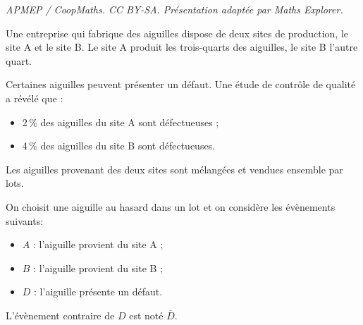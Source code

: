 \documentclass[10pt]{article}
\begin{document}
\noindent\textit{APMEP / CoopMaths. CC BY-SA. Présentation adaptée par Maths Explorer.}\par\medskip
\medskip

Une entreprise qui fabrique des aiguilles dispose de deux sites de production, le site A et le site B.
Le site A produit les trois-quarts des aiguilles, le site B l'autre quart. 

Certaines aiguilles peuvent présenter un défaut. Une étude de contrôle de qualité a révélé que :

\setlength\parindent{9mm}
\begin{itemize}
\item[$\bullet~~$] 2\,\% des aiguilles du site A sont défectueuses ;
\item[$\bullet~~$] 4\,\% des aiguilles du site B sont défectueuses.
\end{itemize}
\setlength\parindent{0mm}
\medskip

Les aiguilles provenant des deux sites sont mélangées et vendues ensemble par lots. 

On choisit une aiguille au hasard dans un lot et on considère les évènements suivants:

\setlength\parindent{9mm}
\begin{itemize}
\item[$\bullet~~$]$A$ : l'aiguille provient du site A ; 
\item[$\bullet~~$]$B$ : l'aiguille provient du site B ;
\item[$\bullet~~$]$D$ : l'aiguille présente un défaut.
\end{itemize}
\setlength\parindent{0mm}

L'évènement contraire de $D$ est noté $\overline{D}$.

\medskip
\end{document}
